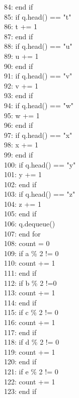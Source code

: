 \documentclass[a4paper]{book}
\theoremstyle{definition}
\begin{document}
{84: \indent end if \\
85: \indent if q.head() == "t" \\
86: \indent\indent t += 1 \\
87: \indent end if \\
88: \indent if q.head() == "u" \\
89: \indent\indent u += 1 \\
90: \indent end if \\
91: \indent if q.head() == "v" \\
92: \indent\indent v += 1 \\
93: \indent end if \\
94: \indent if q.head() == "w" \\
95: \indent\indent w += 1 \\
96: \indent end if \\
97: \indent if q.head() == "x" \\
98: \indent\indent x += 1 \\
99: \indent end if \\
100: \indent if q.head() == "y" \\
101: \indent\indent y += 1 \\
102: \indent end if \\
103: \indent if q.head() == "z" \\
104: \indent\indent z += 1 \\
105: \indent end if \\
106: \indent q.dequeue() \\
107: end for \\
108: count = 0 \\
109: if a \% 2 != 0 \\
110: \indent count += 1 \\
111: end if \\
112: if b \% 2 !=0 \\
113: \indent count += 1 \\
114: end if \\
115: if c \% 2 != 0 \\
116: \indent count += 1 \\
117: end if \\
118: if d \% 2 != 0 \\
119: \indent count += 1 \\
120: end if \\
121: if e \% 2 != 0 \\
122: \indent count += 1 \\
123: end if \\
}
\end{document}
